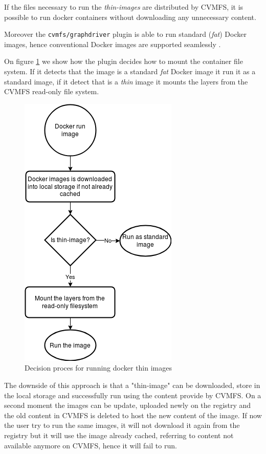 If the files necessary to run the \textit{thin-images} are distributed by CVMFS, it is
possible to run docker containers without downloading any unnecessary content.

Moreover the \texttt{cvmfs/graphdriver} plugin is able to run standard (\textit{fat})
Docker images, hence conventional Docker images are supported seamlessly \cite{graphdriver-plugin}.

On figure \ref{fig:flowchart-run-thin-image} we show how the plugin decides how
to mount the container file system. If it detects that the image is a standard
\textit{fat} Docker image it run it as a standard image, if it detect that is a
\textit{thin} image it mounts the layers from the CVMFS read-only file system.

\begin{figure}
\includegraphics{gfx/RunThinImages}
\caption{Decision proces for running docker thin images}
\label{fig:flowchart-run-thin-image}
\end{figure}

The downside of this approach is that a "thin-image" can be downloaded, store in
the local storage and successfully run using the content provide by CVMFS. On a
second moment the images can be update, uploaded newly on the registry and the
old content in CVMFS is deleted to host the new content of the image. If now
the user try to run the same images, it will not download it again from the
registry but it will use the image already cached, referring
to content not available anymore on CVMFS, hence it will fail to run.

